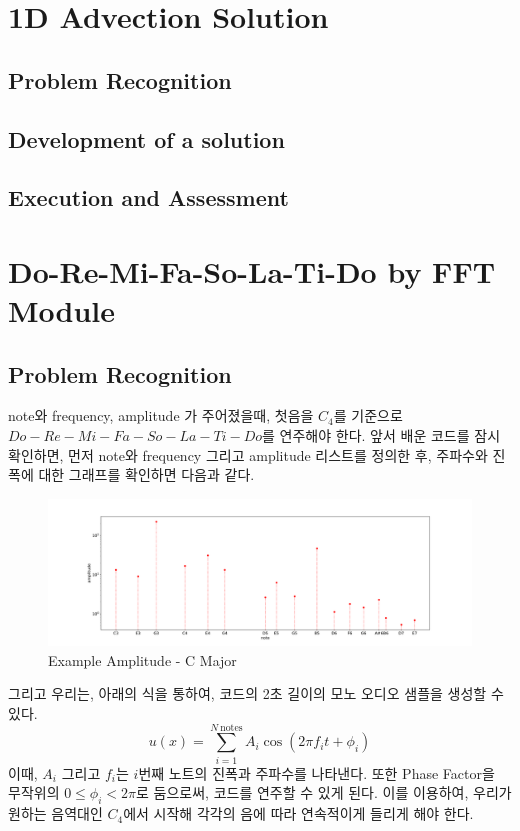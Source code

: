 \documentclass[11pt]{article}
\begin{document}
\section{1D Advection Solution}
\subsection{Problem Recognition} 


\subsection{Development of a solution} 



\subsection{Execution and Assessment}
















\section{Do-Re-Mi-Fa-So-La-Ti-Do by FFT Module}
\subsection{Problem Recognition} 
note와 frequency, amplitude 가 주어졌을때, 첫음을 $C_4$를 기준으로 $Do-Re-Mi-Fa-So-La-Ti-Do$를 연주해야 한다. 앞서 배운 코드를 잠시 확인하면, 먼저 note와 frequency 그리고 amplitude 리스트를 정의한 후,  주파수와 진폭에 대한 그래프를 확인하면 다음과 같다.
\begin{figure}[!ht]
  \centering
  \includegraphics[width=1\textwidth]{example_DO.pdf}
  \caption{Example Amplitude - C Major}
\end{figure}
그리고 우리는,  아래의 식을 통하여, 코드의 2초 길이의 모노 오디오 샘플을 생성할 수 있다.
\begin{equation}
u(x) = \sum_{i = 1}^{N\ \text{notes}} A_i \cos(2\pi f_i t + \phi_i)
\end{equation}
이때, $A_i$ 그리고 $f_i$는 $i$번째 노트의 진폭과 주파수를 나타낸다. 또한 Phase Factor을 무작위의 $0 \le \phi_i < 2\pi$로 둠으로써, 코드를 연주할 수 있게 된다. 이를 이용하여, 우리가 원하는 음역대인 $C_4$에서 시작해 각각의 음에 따라 연속적이게 들리게 해야 한다. 
\end{document}
